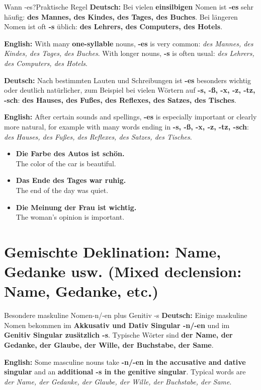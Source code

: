 \documentclass[a4paper,11pt]{article}
\newcommand{\GermanText}[1]{\textbf{Deutsch: }#1\par}
\newcommand{\EnglishText}[1]{{\small\color{SoftGray}\textbf{English: }#1\par}}
\newcommand{\ExampleItem}[2]{\item \textbf{#1}\\{\small\color{SoftGray}#2}}
\begin{document}
\begin{grammarentry}{Wann -es?}{Praktische Regel}
\GermanText{Bei vielen \textbf{einsilbigen} Nomen ist \textbf{-es} sehr häufig: \textbf{des Mannes, des Kindes, des Tages, des Buches}. Bei längeren Nomen ist oft \textbf{-s} üblich: \textbf{des Lehrers, des Computers, des Hotels}.}
\EnglishText{With many \textbf{one-syllable} nouns, \textbf{-es} is very common: \emph{des Mannes, des Kindes, des Tages, des Buches}. With longer nouns, \textbf{-s} is often usual: \emph{des Lehrers, des Computers, des Hotels}.}

\GermanText{Nach bestimmten Lauten und Schreibungen ist \textbf{-es} besonders wichtig oder deutlich natürlicher, zum Beispiel bei vielen Wörtern auf \textbf{-s, -ß, -x, -z, -tz, -sch}: \textbf{des Hauses, des Fußes, des Reflexes, des Satzes, des Tisches}.}
\EnglishText{After certain sounds and spellings, \textbf{-es} is especially important or clearly more natural, for example with many words ending in \textbf{-s, -ß, -x, -z, -tz, -sch}: \emph{des Hauses, des Fußes, des Reflexes, des Satzes, des Tisches}.}
\end{grammarentry}

\begin{exbox}
\begin{itemize}
\ExampleItem{Die Farbe des Autos ist schön.}{The color of the car is beautiful.}
\ExampleItem{Das Ende des Tages war ruhig.}{The end of the day was quiet.}
\ExampleItem{Die Meinung der Frau ist wichtig.}{The woman's opinion is important.}
\end{itemize}
\end{exbox}

\section{Gemischte Deklination: Name, Gedanke usw. \textnormal{(Mixed declension: Name, Gedanke, etc.)}}
\begin{grammarentry}{Besondere maskuline Nomen}{-n/-en plus Genitiv -s}
\GermanText{Einige maskuline Nomen bekommen im \textbf{Akkusativ und Dativ Singular -n/-en} und im \textbf{Genitiv Singular zusätzlich -s}. Typische Wörter sind \textbf{der Name, der Gedanke, der Glaube, der Wille, der Buchstabe, der Same}.}
\EnglishText{Some masculine nouns take \textbf{-n/-en in the accusative and dative singular} and an \textbf{additional -s in the genitive singular}. Typical words are \emph{der Name, der Gedanke, der Glaube, der Wille, der Buchstabe, der Same}.}
\end{grammarentry}
\end{document}
